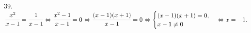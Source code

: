 39. $\cfrac{x^2}{x-1}=\cfrac{1}{x-1}\Leftrightarrow\cfrac{x^2-1}{x-1}=0\Leftrightarrow \cfrac{(x-1)(x+1)}{x-1}=0\Leftrightarrow
\begin{cases} (x-1)(x+1)=0, \\ x-1\neq0 \end{cases} \Leftrightarrow x=-1.$\\
